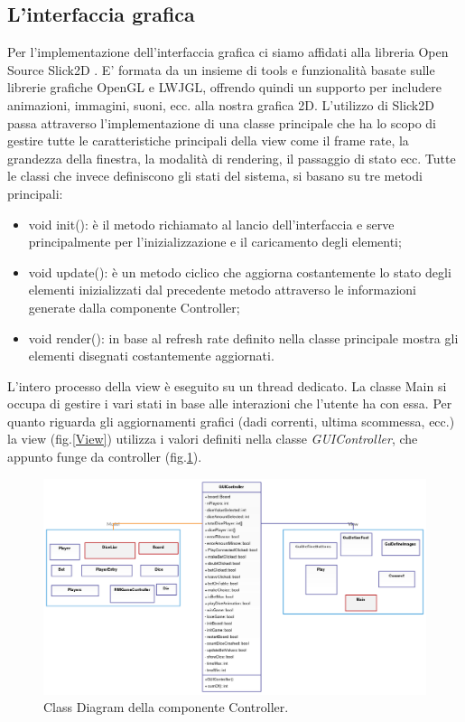 \documentclass{llncs}
\begin{document}
		\subsection{L'interfaccia grafica}
			Per l'implementazione dell'interfaccia grafica ci siamo affidati alla libreria Open Source Slick2D \cite{Slick}. E' formata da un insieme di tools e funzionalità basate sulle librerie grafiche OpenGL e LWJGL, offrendo quindi un supporto per includere animazioni, immagini, suoni, ecc. alla nostra grafica 2D. L'utilizzo di Slick2D passa attraverso l'implementazione di una classe principale che ha lo scopo di gestire tutte le caratteristiche principali della view come il frame rate, la grandezza della finestra, la modalità di rendering, il passaggio di stato ecc. Tutte le classi che invece definiscono gli stati del sistema, si basano su tre metodi principali: 
				\begin{itemize}
					\item void init(): è il metodo richiamato al lancio dell'interfaccia e serve principalmente per l'inizializzazione e il caricamento degli elementi;
					\item void update(): è un metodo ciclico che aggiorna costantemente lo stato degli elementi inizializzati dal precedente metodo attraverso le informazioni generate dalla componente Controller;
					\item void render(): in base al refresh rate definito nella classe principale mostra gli elementi disegnati costantemente aggiornati.
				\end{itemize}
			L'intero processo della view è eseguito su un thread dedicato. La classe Main si occupa di gestire i vari stati in base alle interazioni che l'utente ha con essa.
			Per quanto riguarda gli aggiornamenti grafici (dadi correnti, ultima scommessa, ecc.) la view (fig.\ref*{View}) utilizza i valori definiti nella classe \textit{GUIController}, che appunto funge da controller (fig.\ref{Controller}).
		\begin{figure}[H]
			\includegraphics[scale=0.34]{img/Controller.png}
			\caption{\small{Class Diagram della componente Controller.}}
			\label{Controller}
		\end{figure}	
\end{document}

